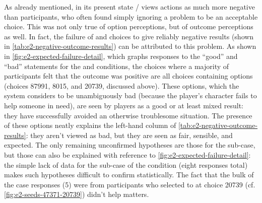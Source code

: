 As already mentioned, in its present state \dunyazad/ views  actions as much more negative than participants, who often found simply ignoring a problem to be an acceptable choice.
%
This was not only true of option perceptions, but of outcome perceptions as well.
%
In fact, the failure of \expf{} and \obvsa{} choices to give reliably negative results (shown in \cref{tab:e2-negative-outcome-results}) can be attributed to this problem.
%
As shown in \cref{fig:e2-expected-failure-detail}, which graphs responses to the ``good'' and ``bad'' statements for the \expf{} and \obvsa{} conditions, the choices where a majority of participants felt that the outcome was positive are all choices containing  options (choices 87991, 8015, and 20739, discussed above).
%
These  options, which the system considers to be unambiguously bad (because the player's character fails to help someone in need), are seen by players as a good or at least mixed result: they have successfully avoided an otherwise troublesome situation.
%
The presence of these options neatly explains the left-hand column of \cref{tab:e2-negative-outcome-results}: they aren't viewed as bad, but they are seen as fair, sensible, and expected.
%
The only remaining unconfirmed hypotheses are those for the \obvsa{} sub-case, but those can also be explained with reference to \cref{fig:e2-expected-failure-detail}: the simple lack of data for the \casea{} sub-case of the \obvs{} condition (eight responses total) makes such hypotheses difficult to confirm statistically.
%
The fact that the bulk of the \obvsa{} case responses (5) were from participants who selected to  at choice 20739 (cf. \cref{fig:e2-seeds-47371-20739}) didn't help matters.

